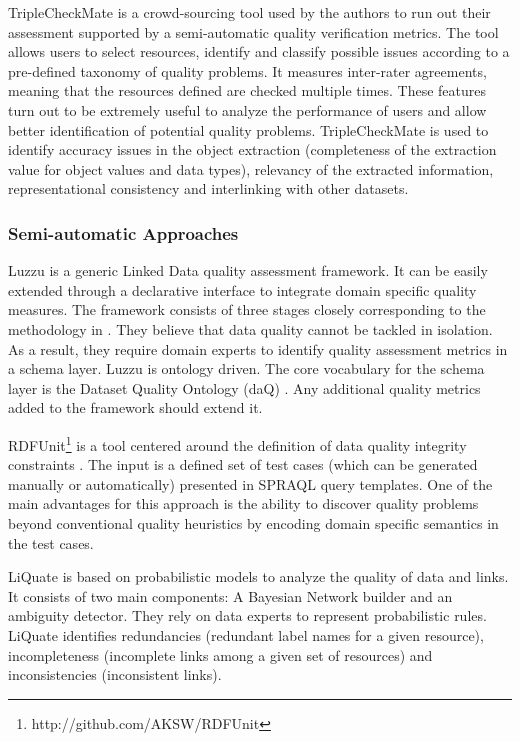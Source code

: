 \documentclass[onecolumn, crcready]{iosart2c}
\begin{document}
TripleCheckMate \cite{Kontokostas2013} is a crowd-sourcing tool used by the authors to run out their assessment supported by a semi-automatic quality verification metrics. The tool allows users to select resources, identify and classify possible issues according to a pre-defined taxonomy of quality problems. It measures inter-rater agreements, meaning that the resources defined are checked multiple times. These features turn out to be extremely useful to analyze the performance of users and allow better identification of potential quality problems. TripleCheckMate is used to identify accuracy issues in the object extraction (completeness of the extraction value for object values and data types), relevancy of the extracted information, representational consistency and interlinking with other datasets.

\subsubsection{Semi-automatic Approaches}

Luzzu \cite{DBLP:journals/corr/DebattistaLLA14} is a generic Linked Data quality assessment framework. It can be easily extended through a declarative interface to integrate domain specific quality measures. The framework consists of three stages closely corresponding to the methodology in \cite{DBLP:conf/i-semantics/RulaZ14}. They believe that data quality cannot be tackled in isolation. As a result, they require domain experts to identify quality assessment metrics in a schema layer. Luzzu is ontology driven. The core vocabulary for the schema layer is the Dataset Quality Ontology (daQ) \cite{DBLP:conf/www/Debattista0A14}. Any additional quality metrics added to the framework should extend it.

RDFUnit\footnote{http://github.com/AKSW/RDFUnit} is a tool centered around the definition of data quality integrity constraints \cite{Kontokostas:2014:TEL:2566486.2568002}. The input is a defined set of test cases (which can be generated manually or automatically) presented in SPRAQL query templates. One of the main advantages for this approach is the ability to discover quality problems beyond conventional quality heuristics by encoding domain specific semantics in the test cases.

LiQuate \cite{conf/otm/RuckhausBV13} is based on probabilistic models to analyze the quality of data and links. It consists of two main components: A Bayesian Network builder and an ambiguity detector. They rely on data experts to represent probabilistic rules. LiQuate identifies redundancies (redundant label names for a given resource), incompleteness (incomplete links among a given set of resources) and inconsistencies (inconsistent links).
\end{document}
